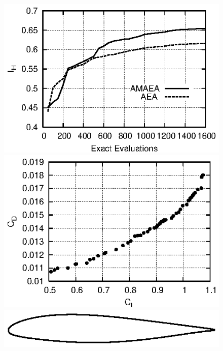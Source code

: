 \documentclass{vki_ls}
\begin{document}
\begin{figure}[!ht]
\centering
\begin{minipage}{1.0\linewidth}
    \centering
    \begin{minipage}{0.48\linewidth}
        \includegraphics[scale=1.2]{amaea/amaeaVsAea.eps}
    \end{minipage}
    \begin{minipage}{0.48\linewidth}
        \includegraphics[scale=1.2]{amaea/paretoGeamaea.eps}
    \end{minipage}
\end{minipage}
\begin{minipage}{1.0\linewidth}
    \centering
    \begin{minipage}{0.32\linewidth}
        \includegraphics[trim=0 0 0 90,clip,scale=0.7]{amaea/airfoil01.eps}

\end{minipage}
\end{minipage}
\end{figure}
\end{document}
